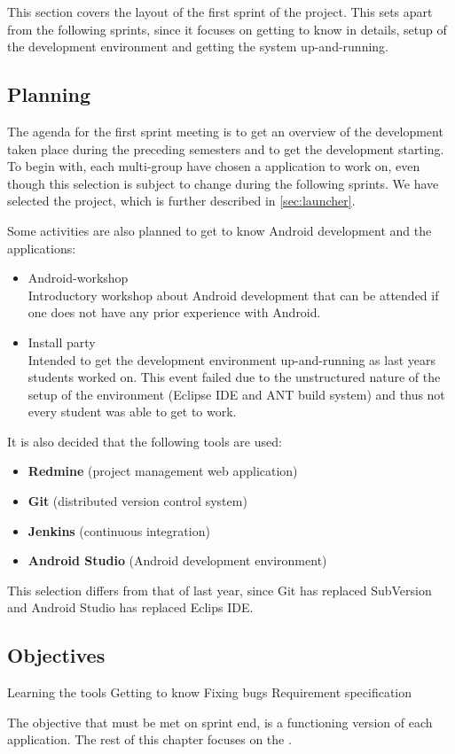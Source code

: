 This section covers the layout of the first sprint of the project.
This sets apart from the following sprints, since it focuses on getting to know \giraf in details, setup of the development environment and getting the system up-and-running.

\subsection{Planning}
The agenda for the first sprint meeting is to get an overview of the development taken place during the preceding semesters and to get the development starting.
To begin with, each multi-group have chosen a \giraf application to work on, even though this selection is subject to change during the following sprints.
We have selected the \launcher project, which is further described in \cref{sec:launcher}.

Some activities are also planned to get to know Android development and the \giraf applications:

\begin{itemize}
\item Android-workshop\\
Introductory workshop about Android development that can be attended if one does not have any prior experience with Android.
\item Install party\\
Intended to get the \giraf development environment up-and-running as last years students worked on. This event failed due to the unstructured nature of the setup of the environment (Eclipse IDE and ANT build system) and thus not every student was able to get \giraf to work.
\end{itemize}


It is also decided that the following tools are used:

\begin{itemize}
\item \textbf{Redmine} (project management web application)
\item \textbf{Git} (distributed version control system)
\item \textbf{Jenkins} (continuous integration)
\item \textbf{Android Studio} (Android development environment)
\end{itemize}

This selection differs from that of last year, since Git has replaced SubVersion and Android Studio has replaced Eclips IDE.


\subsection{Objectives}
Learning the tools
Getting to know \giraf
Fixing bugs
Requirement specification

The objective that must be met on sprint end, is a functioning version of each application.
The rest of this chapter focuses on the \launcher.